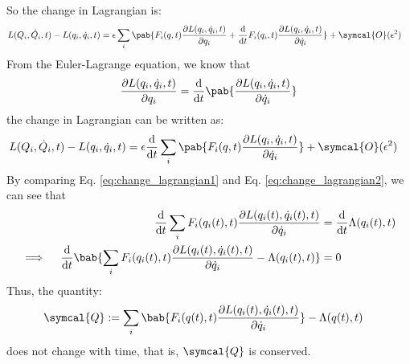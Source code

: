 So the change in Lagrangian is:
\begin{align}
  L(Q_i, \dot{Q}_i, t) - L(q_i, \dot{q}_i, t) & = \epsilon \sum_i \pab{
    F_i(q, t) \pdv{L(q_i, \dot{q}_i, t)}{q_i} + \odv{}{t} F_i(q_i, t) \pdv{L(q_i, \dot{q}_i, t)}{\dot{q}_i}
  } + \symcal{O}(\epsilon^2)
  \label{eq:change_lagrangian2}
\end{align}
From the Euler-Lagrange equation, we know that
\begin{align}
  \pdv{L(q_i, \dot{q}_i, t)}{q_i} = \odv{}{t} \pab{\pdv{L(q_i, \dot{q}_i, t)}{\dot{q}_i}}
\end{align}
the change in Lagrangian can be written as:
\begin{align}
  L(Q_i, \dot{Q}_i, t) - L(q_i, \dot{q}_i, t) & = \epsilon \odv{}{t} \sum_i \pab{
    F_i(q, t) \pdv{L(q_i, \dot{q}_i, t)}{\dot{q}_i}
  } + \symcal{O}(\epsilon^2)
  \label{eq:change_lagrangian3}
\end{align}
By comparing Eq. \eqref{eq:change_lagrangian1} and Eq. \eqref{eq:change_lagrangian2}, we can see that
\begin{align}
  \odv{}{t} \sum_i F_i(q_i(t), t) \pdv{L(q_i(t), \dot{q}_i(t), t)}{\dot{q}_i}
   & = \odv{}{t} \Lambda(q_i(t), t) \\
  \implies \quad \odv{}{t} \bab{
    \sum_i F_i(q_i(t), t) \pdv{L(q_i(t), \dot{q}_i(t), t)}{\dot{q}_i} - \Lambda(q_i(t), t)
  }
   & = 0
\end{align}
Thus, the quantity:
\begin{align}
  \symcal{Q} & := \sum_i \bab{
    F_i(q(t), t) \pdv{L(q_i(t), \dot{q}_i(t), t)}{\dot{q}_i}
  } - \Lambda(q(t), t)
\end{align}
does not change with time, that is, $\symcal{Q}$ is conserved.

